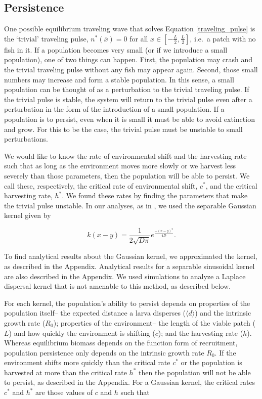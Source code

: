 \documentclass[12pt,english]{article}
\begin{document}
\begin{spacing}{1.9}
\begin{flushleft}
\subsection{Persistence }
One possible equilibrium traveling wave that solves Equation \ref{traveling_pulse} is the `trivial' traveling pulse, $n^*(\bar{x}) = 0$ for all $x \in \left[-\frac{L}
{2}, \frac{L}{2}\right]$, i.e.~a patch with no fish in it.  If a population becomes very small (or if we introduce a small 
population), one of two things can happen. First, the population may crash and the trivial traveling pulse 
without any fish may appear again. Second, those small numbers may increase and form a stable population. 
In this sense, a small population can be thought of as a perturbation to the trivial traveling pulse. If the trivial 
pulse is stable, the system will return to the trivial pulse even after a perturbation in the form of the introduction 
of a small population. If a population is to persist, even when it is small it must be able to avoid extinction and 
grow. For this to be the case, the trivial pulse must be unstable to small perturbations.  

We would like to know the rate of environmental shift and the harvesting rate such that as long as the 
environment moves more slowly or we harvest less severely than those parameters, then the population will be able to persist. We call these, respectively, the critical rate of environmental shift, $c^*$, and the critical harvesting rate, $h^*$. 
We found these rates by finding the parameters that make the trivial pulse unstable.   In our analyses, as in \citep{Latore:1998fk}, we used the separable Gaussian kernel given by

\[k(x-y)=\frac{1}{2\sqrt{D\pi}}e^{\frac{-(x-y)^2}{4D}}.\]

\noindent To find analytical results about the Gaussian kernel, we approximated the kernel, as described in the Appendix.  Analytical results for a separable sinusoidal kernel are also described in the Appendix.  We used 
simulations to analyze a Laplace dispersal kernel that is not amenable to this method, as described below.

For each kernel, the population's ability to persist depends on properties of the population itself-- the expected distance a larva disperses ($\langle d \rangle$) and the intrinsic growth rate ($R_0$); properties of the environment-- the length of the viable patch ($L$) and how quickly the environment is shifting ($c$); and the harvesting rate ($h
$).  Whereas equilibrium biomass depends on the function form of recruitment, population persistence only depends on the intrinsic growth rate $R_0$.  If the environment shifts more quickly than the critical rate $c^*$ or the population is harvested at more than the critical rate $h^*$ then the population will not be able to persist, as described in the Appendix.  For a Gaussian kernel, the critical rates $c^*$ and $h^*$ are those values of $c$ and $h$ such that 


\end{flushleft}
\end{spacing}
\end{document}

